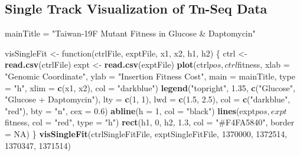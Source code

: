 \documentclass[11pt,]{article}
\newenvironment{Shaded}{\begin{snugshade}}{\end{snugshade}}
\newcommand{\KeywordTok}[1]{\textcolor[rgb]{0.13,0.29,0.53}{\textbf{{#1}}}}
\newcommand{\DataTypeTok}[1]{\textcolor[rgb]{0.13,0.29,0.53}{{#1}}}
\newcommand{\DecValTok}[1]{\textcolor[rgb]{0.00,0.00,0.81}{{#1}}}
\newcommand{\FloatTok}[1]{\textcolor[rgb]{0.00,0.00,0.81}{{#1}}}
\newcommand{\StringTok}[1]{\textcolor[rgb]{0.31,0.60,0.02}{{#1}}}
\newcommand{\OtherTok}[1]{\textcolor[rgb]{0.56,0.35,0.01}{{#1}}}
\newcommand{\NormalTok}[1]{{#1}}
\begin{document}
\newpage

\subsection{Single Track Visualization of Tn-Seq
Data}\label{single-track-visualization-of-tn-seq-data}

\begin{Shaded}
\begin{Highlighting}[]
\NormalTok{mainTitle =}\StringTok{ "Taiwan-19F Mutant Fitness in Glucose & Daptomycin"}

\NormalTok{visSingleFit <-}\StringTok{ }\NormalTok{function(ctrlFile, exptFile, x1, x2, h1, h2) \{}
    \NormalTok{ctrl <-}\StringTok{ }\KeywordTok{read.csv}\NormalTok{(ctrlFile)}
    \NormalTok{expt <-}\StringTok{ }\KeywordTok{read.csv}\NormalTok{(exptFile)}
    \KeywordTok{plot}\NormalTok{(ctrl$pos, ctrl$fitness, }\DataTypeTok{xlab =} \StringTok{"Genomic Coordinate"}\NormalTok{, }
        \DataTypeTok{ylab =} \StringTok{"Insertion Fitness Cost"}\NormalTok{, }\DataTypeTok{main =} \NormalTok{mainTitle, }\DataTypeTok{type =} \StringTok{"h"}\NormalTok{, }
        \DataTypeTok{xlim =} \KeywordTok{c}\NormalTok{(x1, x2), }\DataTypeTok{col =} \StringTok{"darkblue"}\NormalTok{)}
    \KeywordTok{legend}\NormalTok{(}\StringTok{"topright"}\NormalTok{, }\FloatTok{1.35}\NormalTok{, }\KeywordTok{c}\NormalTok{(}\StringTok{"Glucose"}\NormalTok{, }\StringTok{"Glucose + Daptomycin"}\NormalTok{), }
        \DataTypeTok{lty =} \KeywordTok{c}\NormalTok{(}\DecValTok{1}\NormalTok{, }\DecValTok{1}\NormalTok{), }\DataTypeTok{lwd =} \KeywordTok{c}\NormalTok{(}\FloatTok{1.5}\NormalTok{, }\FloatTok{2.5}\NormalTok{), }\DataTypeTok{col =} \KeywordTok{c}\NormalTok{(}\StringTok{"darkblue"}\NormalTok{, }
            \StringTok{"red"}\NormalTok{), }\DataTypeTok{bty =} \StringTok{"n"}\NormalTok{, }\DataTypeTok{cex =} \FloatTok{0.6}\NormalTok{)}
    \KeywordTok{abline}\NormalTok{(}\DataTypeTok{h =} \DecValTok{1}\NormalTok{, }\DataTypeTok{col =} \StringTok{"black"}\NormalTok{)}
    \KeywordTok{lines}\NormalTok{(expt$pos, expt$fitness, }\DataTypeTok{col =} \StringTok{"red"}\NormalTok{, }\DataTypeTok{type =} \StringTok{"h"}\NormalTok{)}
    \KeywordTok{rect}\NormalTok{(h1, }\DecValTok{0}\NormalTok{, h2, }\FloatTok{1.3}\NormalTok{, }\DataTypeTok{col =} \StringTok{"#F4FA5840"}\NormalTok{, }\DataTypeTok{border =} \OtherTok{NA}\NormalTok{)}
\NormalTok{\}}
\KeywordTok{visSingleFit}\NormalTok{(ctrlSingleFitFile, exptSingleFitFile, }\DecValTok{1370000}\NormalTok{, }\DecValTok{1372514}\NormalTok{, }
    \DecValTok{1370347}\NormalTok{, }\DecValTok{1371514}\NormalTok{)}
\end{Highlighting}
\end{Shaded}
\end{document}
